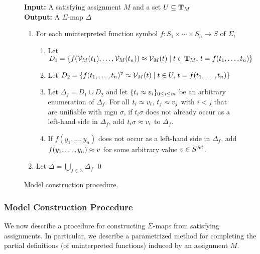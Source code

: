 \documentclass{svjour3}                     %
\begin{document}
\begin{figure}[t]
\begin{framed}
{\bf Input:} A satisfying assignment $M$ and a set $U \subseteq \mathbf{T}_M$ \\
{\bf Output:} A $\Sigma$-map $\Delta$
\begin{enumerate}

\item
For each uninterpreted function symbol $f : S_1 \times \cdots \times S_n \rightarrow S$ 
of $\Sigma$,
\smallskip

\begin{enumerate}
\item 
Let 
$D_1 = \{ f(\mathcal{V}_{M}(t_1),\ldots,\mathcal{V}_{M}(t_n)) \approx \mathcal{V}_{M}(t) \mid 
          t \in \mathbf{T}_M,\, t = f(t_1,\ldots,t_n) \}
$
\smallskip

\item
Let 
$D_2 = \{ f(t_1,\ldots,t_n)^\forall \approx \mathcal{V}_{M}(t) \mid 
          t \in U,\, t = f(t_1,\ldots,t_n) \}
$
\smallskip

\item
Let $\Delta_f = D_1 \cup D_2$ and
let $\{t_i \approx v_i\}_{0\leq i \leq m}$ be an arbitrary enumeration of $\Delta_f$.
For all $t_i \approx v_i$, $t_j \approx v_j$ with $i < j$ that are unifiable with mgu $\sigma$,
if $t_i\sigma$ does not already occur as a left-hand side in $\Delta_f$,
add $t_i\sigma \approx v_i$ to $\Delta_f$.
\smallskip

\item
If $f(y_1,\ldots,y_n)$ does not occur as a left-hand side in $\Delta_f$,
add $f(y_1,\ldots,y_n) \approx v$ for some arbitrary value $v \in S^{\mathcal{M}}$.
\end{enumerate}
\smallskip

\item
Let $\Delta = \bigcup_{f \in \Sigma} \Delta_f$
\qed
\end{enumerate}
\end{framed}
\caption{Model construction procedure.}
\label{fig:mcp}
\end{figure}

\subsubsection*{Model Construction Procedure}
We now describe a procedure for constructing $\Sigma$-maps
from satisfying assignments.
In particular, we describe a parametrized method for completing
the partial definitions (of uninterpreted functions) induced by 
an assignment $M$.
\end{document}

